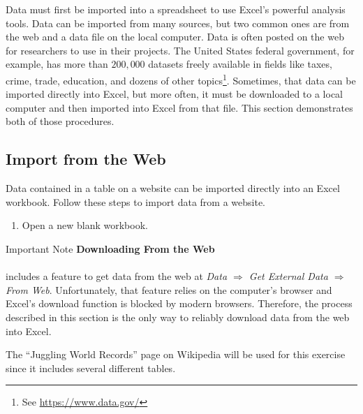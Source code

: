 Data must first be imported into a spreadsheet to use Excel’s powerful analysis tools. Data can be imported from many sources, but two common ones are from the web and a data file on the local computer. Data is often posted on the web for researchers to use in their projects. The United States federal government, for example, has more than $ 200,000 $ datasets freely available in fields like taxes, crime, trade, education, and dozens of other topics\footnote{See \url{https://www.data.gov/}}. Sometimes, that data can be imported directly into Excel, but more often, it must be downloaded to a local computer and then imported into Excel from that file. This section demonstrates both of those procedures.

\subsection{Import from the Web}

Data contained in a table on a website can be imported directly into an Excel workbook. Follow these steps to import data from a website.

\begin{enumbox}
	\begin{enumerate}
		\item Open a new blank workbook.
	\end{enumerate}
\end{enumbox}
	
\begin{center}
	\begin{infobox}{Important Note}
		\textbf{Downloading From the Web}
		\\
		\\
		 includes a feature to get data from the web at \textit{Data $ \Rightarrow $ Get External Data $ \Rightarrow $ From Web}. Unfortunately, that feature relies on the computer's browser and Excel's download function is blocked by modern browsers. Therefore, the process described in this section is the only way to reliably download data from the web into Excel.
	\end{infobox}
\end{center}

The ``Juggling World Records'' page on Wikipedia will be used for this exercise since it includes several different tables.

